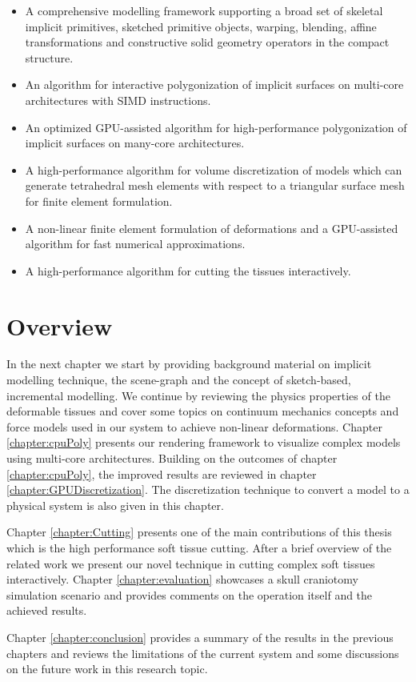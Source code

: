 \begin{itemize}
 \item A comprehensive modelling framework supporting a broad set of skeletal implicit primitives, sketched primitive objects, warping, blending, 
 affine transformations and constructive solid geometry operators in the compact \blob structure.
 \item An algorithm for interactive polygonization of implicit surfaces on multi-core architectures with SIMD instructions.
 \item An optimized GPU-assisted algorithm for high-performance polygonization of implicit surfaces on many-core architectures.
 \item A high-performance algorithm for volume discretization of \blob models which can generate tetrahedral mesh elements with respect to a triangular 
 surface mesh for finite element formulation.
 \item A non-linear finite element formulation of deformations and a GPU-assisted algorithm for fast numerical approximations.
 \item A high-performance algorithm for cutting the tissues interactively. 
\end{itemize}


\section{Overview}
In the next chapter we start by providing background material on implicit modelling technique, the \blob scene-graph and the concept of sketch-based, incremental modelling.
We continue by reviewing the physics properties of the deformable tissues and cover some topics on continuum mechanics concepts and force models used in
our system to achieve non-linear deformations. Chapter \ref{chapter:cpuPoly} presents our rendering framework to visualize complex \blob models using multi-core 
architectures. Building on the outcomes of chapter \ref{chapter:cpuPoly}, the improved results are reviewed in chapter \ref{chapter:GPUDiscretization}. 
The discretization technique to convert a \blob model to a physical system is also given in this chapter. 

Chapter \ref{chapter:Cutting} presents one of the main contributions of this thesis which is the high performance soft tissue cutting. After a brief overview of the 
related work we present our novel technique in cutting complex soft tissues interactively. Chapter \ref{chapter:evaluation} showcases a skull craniotomy simulation 
scenario and provides comments on the operation itself and the achieved results.

Chapter \ref{chapter:conclusion} provides a summary of the results in the previous chapters and reviews the limitations of the current system
and some discussions on the future work in this research topic.


















